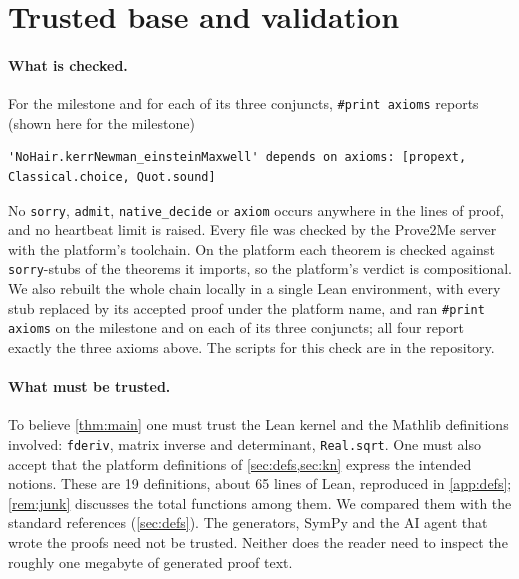 \documentclass[11pt]{article}
\theoremstyle{definition}
\theoremstyle{remark}
\newcommand{\lean}[1]{\lstinline[basicstyle=\ttfamily\normalsize,columns=fullflexible,breaklines=false]{#1}}
\begin{document}
\section{Trusted base and validation}\label{sec:trust}

\paragraph{What is checked.}
For the milestone and for each of its three conjuncts, \lean{#print axioms} reports (shown here for the milestone)
\begin{lstlisting}[basicstyle=\ttfamily\footnotesize]
'NoHair.kerrNewman_einsteinMaxwell' depends on axioms: [propext, Classical.choice, Quot.sound]
\end{lstlisting}
No \lean{sorry}, \lean{admit}, \lean{native_decide} or \lean{axiom} occurs anywhere in the \TotalLines{} lines of proof, and no heartbeat limit is raised.
Every file was checked by the Prove2Me server with the platform's toolchain.
On the platform each theorem is checked against \lean{sorry}-stubs of the theorems it imports, so the platform's verdict is compositional. We also rebuilt the whole chain locally in a single Lean environment, with every stub replaced by its accepted proof under the platform name, and ran \lean{#print axioms} on the milestone and on each of its three conjuncts; all four report exactly the three axioms above. The scripts for this check are in the repository.

\paragraph{What must be trusted.}
To believe \cref{thm:main} one must trust the Lean kernel and the Mathlib definitions involved: \lean{fderiv}, matrix inverse and determinant, \lean{Real.sqrt}.
One must also accept that the platform definitions of \cref{sec:defs,sec:kn} express the intended notions.
These are 19 definitions, about 65 lines of Lean, reproduced in \cref{app:defs}; \cref{rem:junk} discusses the total functions among them.
We compared them with the standard references (\cref{sec:defs}).
The generators, SymPy and the AI agent that wrote the proofs need not be trusted.
Neither does the reader need to inspect the roughly one megabyte of generated proof text.
\end{document}
